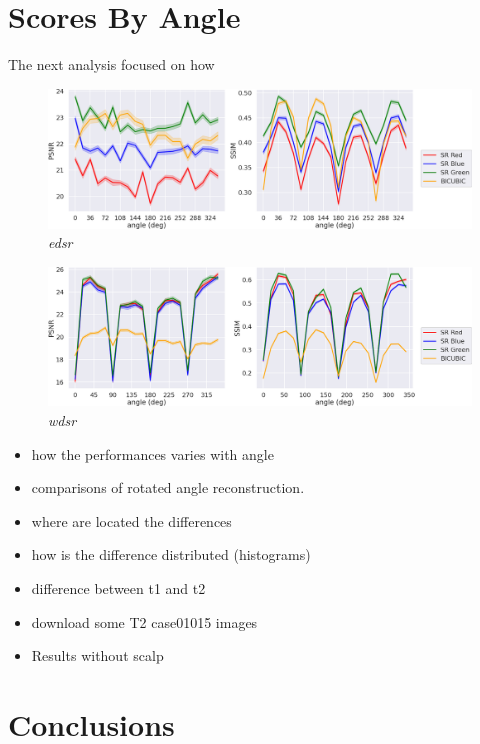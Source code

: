 \documentclass[12pt,a4paper]{report}
\begin{document}
\section{Scores By Angle}

The next analysis focused on how 

\begin{figure}[H]
 \centering
 \includegraphics[scale=0.3]{./images/edsr-angles.png}
 \caption{\it edsr}
 \label{fig:edsr-angles}
\end{figure}


\begin{figure}[H]
 \centering
 \includegraphics[scale=0.3]{./images/wdsr-angles.png}
 \caption{\it wdsr}
 \label{fig:edsr-angles}
\end{figure}

\begin{itemize}
 \setlength\itemsep{-0.2em}
 \item how the performances varies with angle
 \item comparisons of rotated angle reconstruction.
 \item where are located the differences 
 \item how is the difference distributed (histograms)
 \item difference between t1 and t2
 \item download some T2 case01015 images 
 \item Results without scalp
\end{itemize}


\section{}

\section{Conclusions}


\newpage
\thispagestyle{empty}
\listoffigures

\newpage
\nocite{*}


\end{document}
